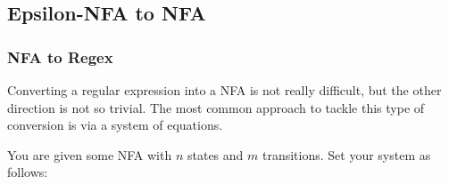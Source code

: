 \subsection{Epsilon-NFA to NFA}




\subsubsection{NFA to Regex}

Converting a regular expression into a NFA is not really difficult, but the other direction is not 
so trivial. The most common approach to tackle this type of conversion is via a system of equations.

You are given some NFA with \(n\) states and \(m\) transitions. Set your system as follows:

